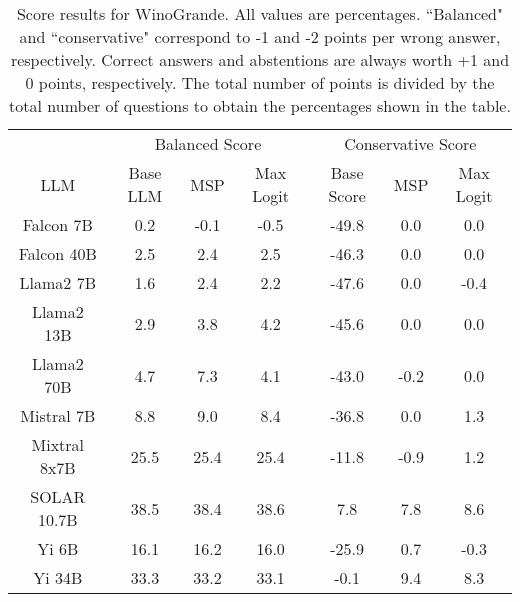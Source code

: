 \renewcommand\arraystretch{1.2}
\begin{table*}
\centering
\begin{tabular}{c|c|c|c|c|c|c}
& \multicolumn{3}{c|}{Balanced Score} & \multicolumn{3}{c}{Conservative Score} \\ 
LLM & Base LLM & MSP & Max Logit & Base Score & MSP & Max Logit\\ \hline
Falcon 7B & 0.2 & -0.1 & -0.5 & -49.8 & 0.0 & 0.0\\
Falcon 40B & 2.5 & 2.4 & 2.5 & -46.3 & 0.0 & 0.0\\
Llama2 7B & 1.6 & 2.4 & 2.2 & -47.6 & 0.0 & -0.4\\
Llama2 13B & 2.9 & 3.8 & 4.2 & -45.6 & 0.0 & 0.0\\
Llama2 70B & 4.7 & 7.3 & 4.1 & -43.0 & -0.2 & 0.0\\
Mistral 7B & 8.8 & 9.0 & 8.4 & -36.8 & 0.0 & 1.3\\
Mixtral 8x7B & 25.5 & 25.4 & 25.4 & -11.8 & -0.9 & 1.2\\
SOLAR 10.7B & 38.5 & 38.4 & 38.6 & 7.8 & 7.8 & 8.6\\
Yi 6B & 16.1 & 16.2 & 16.0 & -25.9 & 0.7 & -0.3\\
Yi 34B & 33.3 & 33.2 & 33.1 & -0.1 & 9.4 & 8.3\\
\hline
\end{tabular}
\caption{Score results for WinoGrande. All values are percentages. ``Balanced" and ``conservative" correspond to -1 and -2 points per wrong answer, respectively. Correct answers and abstentions are always worth +1 and 0 points, respectively. The total number of points is divided by the total number of questions to obtain the percentages shown in the table.}
\label{tab:winogrande_score}
\end{table*}

